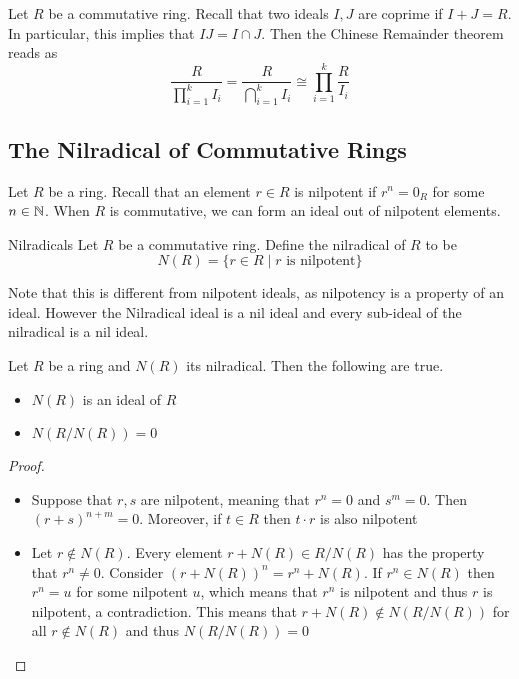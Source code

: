 \documentclass[a4paper]{article}
\begin{document}
Let $R$ be a commutative ring. Recall that two ideals $I,J$ are coprime if $I+J=R$. In particular, this implies that $IJ=I\cap J$. Then the Chinese Remainder theorem reads as $$\frac{R}{\prod_{i=1}^kI_i}=\frac{R}{\bigcap_{i=1}^kI_i}\cong\prod_{i=1}^k\frac{R}{I_i}$$

\subsection{The Nilradical of Commutative Rings}
Let $R$ be a ring. Recall that an element $r\in R$ is nilpotent if $r^n=0_R$ for some $n\in\mathbb{N}$. When $R$ is commutative, we can form an ideal out of nilpotent elements. 

\begin{defn}{Nilradicals}{} Let $R$ be a commutative ring. Define the nilradical of $R$ to be $$N(R)=\{r\in R\;|\;r\text{ is nilpotent}\}$$
\end{defn}

Note that this is different from nilpotent ideals, as nilpotency is a property of an ideal. However the Nilradical ideal is a nil ideal and every sub-ideal of the nilradical is a nil ideal. 

\begin{prp}{}{} Let $R$ be a ring and $N(R)$ its nilradical. Then the following are true. 
\begin{itemize}
\item $N(R)$ is an ideal of $R$
\item $N(R/N(R))=0$
\end{itemize}\tcbline
\begin{proof}~\\
\begin{itemize}
\item Suppose that $r,s$ are nilpotent, meaning that $r^n=0$ and $s^m=0$. Then $(r+s)^{n+m}=0$. Moreover, if $t\in R$ then $t\cdot r$ is also nilpotent
\item Let $r\notin N(R)$. Every element $r+N(R)\in R/N(R)$ has the property that $r^n\neq 0$. Consider $(r+N(R))^n=r^n+N(R)$. If $r^n\in N(R)$ then $r^n=u$ for some nilpotent $u$, which means that $r^n$ is nilpotent and thus $r$ is nilpotent, a contradiction. This means that $r+N(R)\notin N(R/N(R))$ for all $r\notin N(R)$ and thus $N(R/N(R))=0$
\end{itemize}
\end{proof}
\end{prp}
\end{document}
